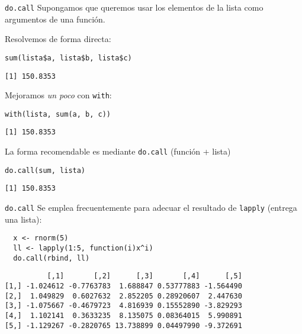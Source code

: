 \documentclass[xcolor={usenames,svgnames,dvipsnames}]{beamer}
\begin{document}
\begin{frame}[label={sec:org5d01004},fragile]{\texttt{do.call}}
 Supongamos que queremos usar los elementos de la lista como argumentos de una función.

Resolvemos de forma directa:
\lstset{language=r,label= ,caption= ,captionpos=b,numbers=none}
\begin{lstlisting}
sum(lista$a, lista$b, lista$c)
\end{lstlisting}

\begin{verbatim}
[1] 150.8353
\end{verbatim}


Mejoramos \emph{un poco} con \texttt{with}:
\lstset{language=r,label= ,caption= ,captionpos=b,numbers=none}
\begin{lstlisting}
with(lista, sum(a, b, c))
\end{lstlisting}

\begin{verbatim}
[1] 150.8353
\end{verbatim}


La forma recomendable es mediante \texttt{do.call} (función + lista)
\lstset{language=r,label= ,caption= ,captionpos=b,numbers=none}
\begin{lstlisting}
do.call(sum, lista)
\end{lstlisting}

\begin{verbatim}
[1] 150.8353
\end{verbatim}
\end{frame}

\begin{frame}[label={sec:org807a2d0},fragile]{\texttt{do.call}}
 Se emplea frecuentemente para adecuar el resultado de \texttt{lapply} (entrega una lista):
\lstset{language=r,label= ,caption= ,captionpos=b,numbers=none}
\begin{lstlisting}
  x <- rnorm(5)
  ll <- lapply(1:5, function(i)x^i)
  do.call(rbind, ll)
\end{lstlisting}

\begin{verbatim}
          [,1]       [,2]      [,3]       [,4]      [,5]
[1,] -1.024612 -0.7763783  1.688847 0.53777883 -1.564490
[2,]  1.049829  0.6027632  2.852205 0.28920607  2.447630
[3,] -1.075667 -0.4679723  4.816939 0.15552890 -3.829293
[4,]  1.102141  0.3633235  8.135075 0.08364015  5.990891
[5,] -1.129267 -0.2820765 13.738899 0.04497990 -9.372691
\end{verbatim}
\end{frame}
\end{document}
